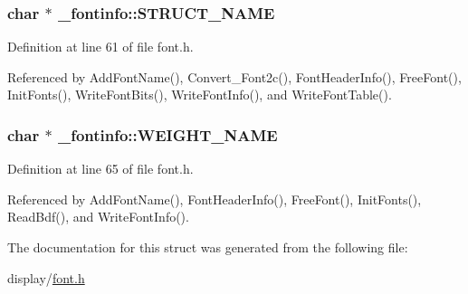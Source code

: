 \subsubsection[{\texorpdfstring{S\+T\+R\+U\+C\+T\+\_\+\+N\+A\+ME}{STRUCT_NAME}}]{\setlength{\rightskip}{0pt plus 5cm}char $\ast$ \+\_\+fontinfo\+::\+S\+T\+R\+U\+C\+T\+\_\+\+N\+A\+ME}\hypertarget{struct__fontinfo_a861ecb4b5f190ccd1e71b38270240f86}{}\label{struct__fontinfo_a861ecb4b5f190ccd1e71b38270240f86}


Definition at line 61 of file font.\+h.



Referenced by Add\+Font\+Name(), Convert\+\_\+\+Font2c(), Font\+Header\+Info(), Free\+Font(), Init\+Fonts(), Write\+Font\+Bits(), Write\+Font\+Info(), and Write\+Font\+Table().

\subsubsection[{\texorpdfstring{W\+E\+I\+G\+H\+T\+\_\+\+N\+A\+ME}{WEIGHT_NAME}}]{\setlength{\rightskip}{0pt plus 5cm}char $\ast$ \+\_\+fontinfo\+::\+W\+E\+I\+G\+H\+T\+\_\+\+N\+A\+ME}\hypertarget{struct__fontinfo_a2f528cb5c1bceb6afd91ad138472d071}{}\label{struct__fontinfo_a2f528cb5c1bceb6afd91ad138472d071}


Definition at line 65 of file font.\+h.



Referenced by Add\+Font\+Name(), Font\+Header\+Info(), Free\+Font(), Init\+Fonts(), Read\+Bdf(), and Write\+Font\+Info().



The documentation for this struct was generated from the following file\+:\begin{DoxyCompactItemize}
\item 
display/\hyperlink{display_2font_8h}{font.\+h}\end{DoxyCompactItemize}
